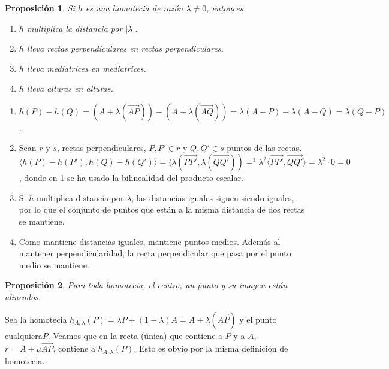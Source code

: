 \documentclass[11pt, a4paper]{article}
\makeatletter
\newif\IfInSansMode
\let\oldsf\sffamily
\renewcommand*{\sffamily}{\oldsf\mathversion{sans}\InSansModetrue}
\let\oldnorm\normalfont
\renewcommand*{\normalfont}{\oldnorm\InSansModefalse\mathversion{normal}}
\renewenvironment{proof}[1][\proofname] {\vspace{-15pt}\par\pushQED{\qed}\normalfont\topsep6\p@\@plus6\p@\relax\trivlist\item[\hskip\labelsep\it#1\@addpunct{.}]\ignorespaces}{\popQED\endtrivlist\@endpefalse}
\renewcommand{\vec}{\overrightarrow}
\renewenvironment{proof}[1][\proofname] {\par\pushQED{\qed}\normalfont\topsep6\p@\@plus6\p@\relax\trivlist\item[\hskip\labelsep\itshape\sffamily#1\@addpunct{.}]\ignorespaces}{\popQED\endtrivlist\@endpefalse}
\theoremstyle{theorem-style}
\newtheorem{nprop}{Proposición}[section]
\theoremstyle{definition-style}
\theoremstyle{remark-style}
\theoremstyle{example-style}
\makeatother
\begin{document}
\begin{nprop} Si $h$ es una homotecia de razón $\lambda\ne 0$, entonces 
\begin{enumerate}
\item $h$ multiplica la distancia por $|\lambda|$.
\item $h$ lleva rectas perpendiculares en rectas perpendiculares.
\item $h$ lleva mediatrices en mediatrices.
\item $h$ lleva alturas en alturas.
\end{enumerate}
\end{nprop}

\begin{proof}\hfill
\begin{enumerate}
	\item $h(P)-h(Q)=(A+\lambda(\vec{AP})) -(A+\lambda(\vec{AQ})) = \lambda(A-P) - \lambda(A-Q) = \lambda (Q-P)$.
	\item  Sean $r$ y $ s$, rectas perpendiculares, $P,P' \in r$ y $Q,Q'\in s$ puntos de las rectas. $\langle h(P) - h(P'),h(Q) - h(Q')\rangle  =  \langle \lambda (\vec{PP'}, \lambda(\vec {QQ'}))=^1 \lambda^2 \langle \vec{PP'},\vec{QQ'}\rangle  = \lambda^2 \cdot 0 = 0 $, donde en 1 se ha usado la bilinealidad del producto escalar.
	\item Si $h$ multiplica distancia por $\lambda$, las distancias iguales siguen siendo iguales, por lo que el conjunto de puntos que están a la misma distancia de dos rectas se mantiene.
	\item Como mantiene distancias iguales, mantiene puntos medios. Además al mantener perpendicularidad, la recta perpendicular que pasa por el punto medio se mantiene.
\end{enumerate}
\end{proof}


\begin{nprop}
	
Para toda homotecia, el centro, un punto y su imagen están alineados.
\end{nprop}

\begin{proof}
	Sea la homotecia $h_{A,\lambda}(P) = \lambda P + (1-\lambda)A = A+\lambda(\vec{AP})$ y el punto cualquiera$P$. Veamos que en la recta (única) que contiene a $P$ y a $ A$, $r= A + \mu \vec{AP}$,  contiene a $h_{A,\lambda} (P)$. Esto es obvio por la misma definición de homotecia.
	
	
\end{proof}
\end{document}

